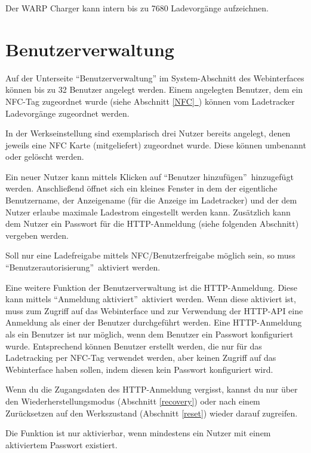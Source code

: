 \documentclass[a4paper,10pt]{article}
\newcommand{\hint}[1]{\begin{tcolorbox}[colback=boxgray,colframe=black,coltext=
white,title=Hinweis,left*=2mm,right*=2mm,boxsep=1mm,bottom=1mm,top=1mm]#1\end{tcolorbox}}
\newcommand*{\fullref}[1]{Abschnitt \hyperref[{#1}]{\ref*{#1}~\nameref*{#1}}}
\begin{document}
\begin{multicols*}{2}
    Der WARP Charger kann intern bis zu 7680 Ladevorgänge aufzeichnen.

    \section{Benutzerverwaltung} \label{user_management}

    Auf der Unterseite \enquote{Benutzerverwaltung} im System-Abschnitt des Webinterfaces können bis zu 32 Benutzer angelegt werden.
    Einem angelegten Benutzer, dem ein NFC-Tag zugeordnet wurde (siehe \fullref{NFC}) können vom Ladetracker Ladevorgänge zugeordnet werden.

    In der Werkseinstellung sind exemplarisch drei Nutzer bereits angelegt,
    denen jeweils eine NFC Karte (mitgeliefert) zugeordnet wurde. Diese können
    umbenannt oder gelöscht werden.

    Ein neuer Nutzer kann mittels Klicken auf \enquote{Benutzer hinzufügen}~hinzugefügt werden.
    Anschließend öffnet sich ein kleines Fenster in dem der eigentliche Benutzername, der Anzeigename (für die Anzeige im Ladetracker)
    und der dem Nutzer erlaube maximale Ladestrom eingestellt werden kann.
    Zusätzlich kann dem Nutzer ein Passwort für die HTTP-Anmeldung (siehe
    folgenden Abschnitt) vergeben werden.

    Soll nur eine Ladefreigabe mittels NFC/Benutzerfreigabe möglich sein, so
    muss \enquote{Benutzerautorisierung}~aktiviert werden.

    Eine weitere Funktion der Benutzerverwaltung ist die HTTP-Anmeldung. Diese
    kann mittels \enquote{Anmeldung aktiviert}~aktiviert werden. Wenn diese aktiviert ist, muss zum Zugriff auf das Webinterface und zur Verwendung
    der HTTP-API eine Anmeldung als einer der Benutzer durchgeführt werden. Eine HTTP-Anmeldung als ein Benutzer ist nur möglich, wenn
    dem Benutzer ein Passwort konfiguriert wurde. Entsprechend können Benutzer erstellt werden, die nur für das Ladetracking per NFC-Tag
    verwendet werden, aber keinen Zugriff auf das Webinterface haben sollen, indem diesen kein Passwort konfiguriert wird.
    \hint{Wenn du die Zugangsdaten des HTTP-Anmeldung vergisst, kannst du nur
    über den Wiederherstellungsmodus (Abschnitt \ref{recovery}) oder nach einem
    Zurücksetzen auf den Werkszustand (Abschnitt \ref{reset}) wieder darauf zugreifen.}
    Die Funktion ist nur aktivierbar, wenn mindestens ein Nutzer mit einem
    aktiviertem Passwort existiert.


\end{multicols*}
\end{document}
